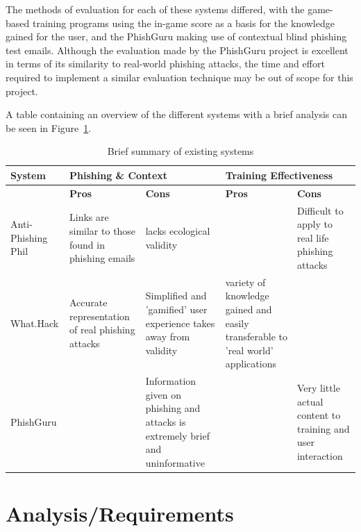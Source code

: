 \documentclass{l4proj}
\begin{document}
The methods of evaluation for each of these systems differed, with the game-based training programs using the in-game score as a basis for the knowledge gained for the user, and the PhishGuru making use of contextual blind phishing test emails. Although the evaluation made by the PhishGuru project is excellent in terms of its similarity to real-world phishing attacks, the time and effort required to implement a similar evaluation technique may be out of scope for this project. 

A table containing an overview of the different systems with a brief analysis can be seen in Figure~\ref{fig:sum_sys}.

\begin{table}[H]
\begin{adjustwidth}{-7em}{-5em}
\begin{tabular}{ | m{8em} | m{10em} | m{10em} | m{10em} | m{10em} | } 
 \hline
 \textbf{System} & \multicolumn{2}{l|}{\textbf{Phishing \& Context}} & \multicolumn{2}{l|}{\textbf{Training Effectiveness}}  \\
 \hline
   & \textbf{Pros} & \textbf{Cons} & \textbf{Pros} & \textbf{Cons} \\
 \hline
  Anti-Phishing Phil & Links are similar to those found in phishing emails & lacks ecological validity  & & Difficult to apply to real life phishing attacks 
  \\
 \hline
 What.Hack & Accurate representation of real phishing attacks & Simplified and 'gamified' user experience takes away from validity & variety of knowledge gained and easily transferable to 'real world' applications & 
  \\
 \hline
 PhishGuru & & Information given on phishing and attacks is extremely brief and uninformative & & Very little actual content to training and user interaction
  \\
 \hline
\end{tabular}
\end{adjustwidth}
\caption{Brief summary of existing systems}
\label{fig:sum_sys}
\end{table}


\chapter{Analysis/Requirements}
\end{document}
